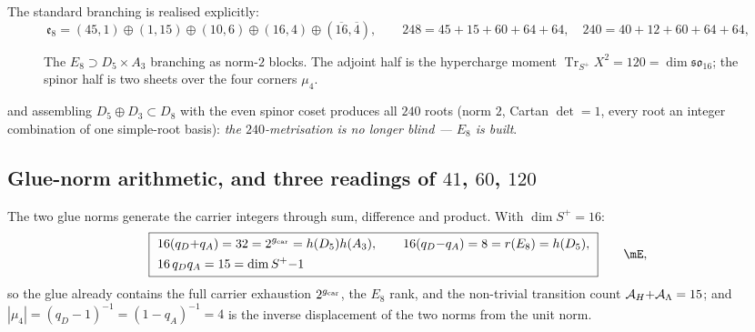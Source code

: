\noindent The standard branching is realised explicitly:
\begin{equation}
  \mathfrak e_8=(45,1)\oplus(1,15)\oplus(10,6)\oplus(16,4)\oplus(\overline{16},\overline4),\qquad
  248=45{+}15{+}60{+}64{+}64,\quad 240=40{+}12{+}60{+}64{+}64 ,
\end{equation}

\begin{figure}[ht]
\centering
{}
\caption{The $E_8\supset D_5\times A_3$ branching as norm-$2$ blocks. The adjoint half is the
hypercharge moment $\operatorname{Tr}_{S^+}X^2=120=\dim\mathfrak{so}_{16}$; the spinor half is two
sheets over the four corners $\mu_4$.}
\label{fig:e8blocks}
\end{figure}
and assembling $D_5\oplus D_3\subset D_8$ with the even spinor coset produces all $240$ roots
(norm $2$, Cartan $\det=1$, every root an integer combination of one simple-root basis): \emph{the
$240$-metrisation is no longer blind --- $E_8$ is built}. \mE

\subsection{Glue-norm arithmetic, and three readings of $41$, $60$, $120$}
The two glue norms generate the carrier integers through sum, difference and product. With
$\dim S^+=16$:
\begin{equation}
  \boxed{\ \begin{aligned}
    &16(q_D{+}q_A)=32=2^{\gcar}=h(D_5)h(A_3),\qquad 16(q_D{-}q_A)=8=r(E_8)=h(D_5),\\
    &16\,q_Dq_A=15=\dim S^+{-}1
  \end{aligned}\ }\qquad\mE ,
\end{equation}
so the glue already contains the full carrier exhaustion $2^{g_{\mathrm{car}}}$, the $E_8$ rank, and the
non-trivial transition count $\mathcal A_H{+}\mathcal A_\Lambda=15$; and $|\mu_4|=(q_D-1)^{-1}=(1-q_A)^{-1}=4$ is the inverse
displacement of the two norms from the unit norm.


